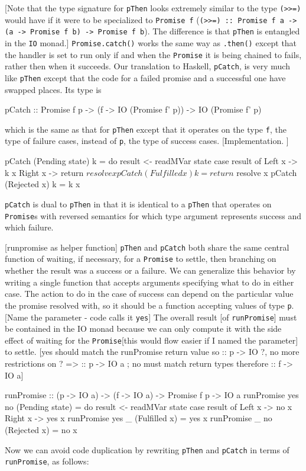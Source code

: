 \documentclass[12pt, english, letterpaper]{kuthesis}
\newcommand{\lit}[1]{\texttt{#1}}
\begin{document}
 [Note that the type signature for \lit{pThen} looks extremely similar to the type \lit{(>>=)} would have if it were to be specialized to \lit{Promise f} (\lit{(>>=) :: Promise f a -> (a -> Promise f b) -> Promise f b}).  The difference is that \lit{pThen} is entangled in the \lit{IO} monad.]
 \lit{Promise.catch()} works the same way as \lit{.then()} except that the handler is set to run only if and when the \lit{Promise} it is being chained to fails, rather then when it succeeds.  Our translation to Haskell, \lit{pCatch}, is very much like \lit{pThen} except that the code for a failed promise and a successful one have swapped places.  Its type is
 \begin{code}
pCatch :: Promise f p
        -> (f -> IO (Promise f' p))
        -> IO (Promise f' p)
\end{code}
which is the same as that for \lit{pThen} except that it operates on the type \lit f, the type of failure cases, instead of \lit p, the type of success cases. [Implementation. ]
\begin{code}
pCatch (Pending state) k = do
  result <- readMVar state
  case result of
    Left x -> k x
    Right x -> return $ resolve x
pCatch (Fulfilled x) k = return $ resolve x
pCatch (Rejected x) k = k x
\end{code}
\lit{pCatch} is dual to \lit{pThen} in that it is identical to a \lit{pThen} that operates on \lit{Promise}s with reversed semantics for which type argument represents success and which failure.

[runpromise as helper function]
\lit{pThen} and \lit{pCatch} both share the same central function of waiting, if necessary, for a \lit{Promise} to settle, then branching on whether the result was a success or a failure.  We can generalize this behavior by writing a single function that accepts arguments specifying what to do in either case.  The action to do in the case of success can depend on the particular value the promise resolved with, so it should be a function accepting values of type \lit p.[Name the parameter - code calls it \lit{yes}]  The overall result [of \lit{runPromise}] must be contained in the IO monad because we can only compute it with the side effect of waiting for the \lit{Promise}[this would flow easier if I named the parameter] to settle.  [yes should match the runPromise return value so :: p -> IO ?, no more restrictions on ? => :: p -> IO a ; no must match return types therefore :: f -> IO a]

\begin{code}
runPromise :: (p -> IO a) -> (f -> IO a) -> Promise f p -> IO a
runPromise yes no (Pending state) = do
  result <- readMVar state
  case result of
    Left x -> no x
    Right x -> yes x
runPromise yes _ (Fulfilled x) = yes x
runPromise _ no (Rejected x) = no x

\end{code}
Now we can avoid code duplication by rewriting \lit{pThen} and \lit{pCatch} in terms of \lit{runPromise}, as follows:
\end{document}

